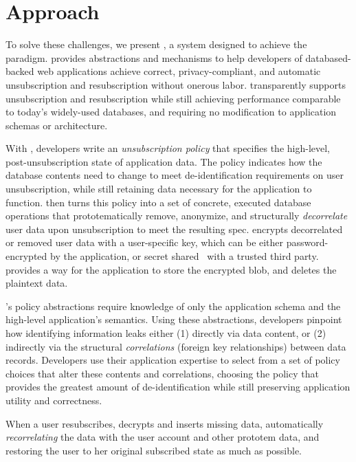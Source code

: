 \section{Approach}
To solve these challenges, we present \sys, a system designed to achieve the \name paradigm.
\sys provides abstractions and mechanisms to help developers of databased-backed web applications
achieve correct, privacy-compliant, and automatic unsubscription and resubscription without onerous
labor.
\sys transparently supports unsubscription and resubscription while still achieving performance
comparable to today’s widely-used databases, and requiring no modification to application schemas or
architecture.

With \sys, developers write an \emph{unsubscription policy} that specifies the high-level,
post-unsubscription state of application data.  The policy indicates how the database contents need
to change to meet de-identification requirements on user unsubscription, while still retaining data
necessary for the application to function. \sys then turns this policy into a set of concrete,
executed database operations that prototematically remove, anonymize, and structurally
\emph{decorrelate} user data upon unsubscription to meet the resulting spec. \sys 
encrypts decorrelated or removed user data with a user-specific key, which can be either
password-encrypted by the application, or secret shared~\cite{secretsharing} with a trusted third
party. \sys provides a way for the application to store the encrypted blob, and deletes the plaintext
data.

\sys's policy abstractions require knowledge of only the application schema and the high-level
application's semantics. Using these abstractions, developers pinpoint how identifying information
leaks either (1) directly via data content, or (2) indirectly via the structural \emph{correlations}
(foreign key relationships) between data records. Developers use their application expertise to
select from a set of policy choices that alter these contents and correlations, choosing the policy
that provides the greatest amount of de-identification while still preserving application
utility and correctness.

When a user resubscribes, \sys decrypts and inserts missing data, automatically
\emph{recorrelating} the data with the user account and other prototem data, and restoring the user to her
original subscribed state as much as possible.


